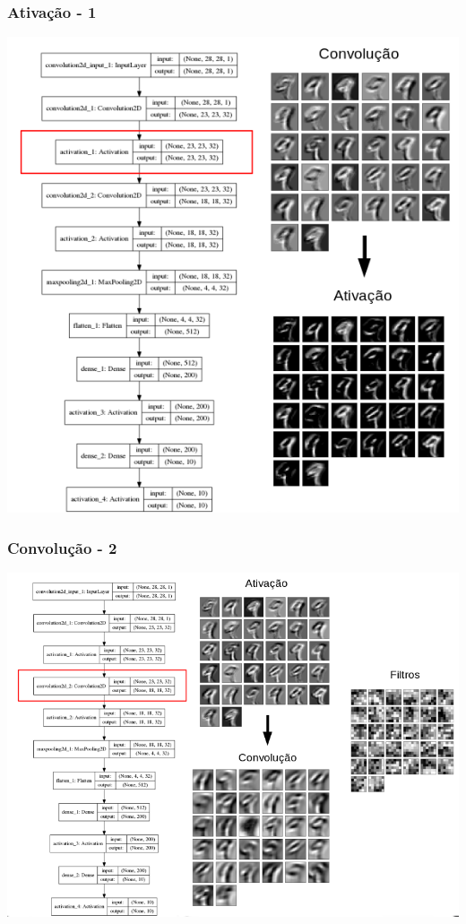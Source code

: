 \documentclass[tikz,10pt]{beamer}
\begin{document}
\begin{frame}
	\frametitle{Ativação - 1}
	\centering
	\includegraphics[height=.8\paperheight]{images/fabio/ativ_1}
\end{frame}

\begin{frame}
	\frametitle{Convolução - 2}
	\centering
	\includegraphics[width=.8\paperwidth]{images/fabio/conv_2}
\end{frame}
\end{document}
